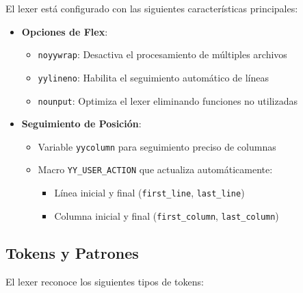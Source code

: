 \documentclass[11pt, a4paper, twoside]{article} %
\begin{document}
El lexer está configurado con las siguientes características principales:

\begin{itemize}
    \item \textbf{Opciones de Flex}:
    \begin{itemize}
        \item \texttt{noyywrap}: Desactiva el procesamiento de múltiples archivos
        \item \texttt{yylineno}: Habilita el seguimiento automático de líneas
        \item \texttt{nounput}: Optimiza el lexer eliminando funciones no utilizadas
    \end{itemize}
    
    \item \textbf{Seguimiento de Posición}:
    \begin{itemize}
        \item Variable \texttt{yycolumn} para seguimiento preciso de columnas
        \item Macro \texttt{YY\_USER\_ACTION} que actualiza automáticamente:
        \begin{itemize}
            \item Línea inicial y final (\texttt{first\_line}, \texttt{last\_line})
            \item Columna inicial y final (\texttt{first\_column}, \texttt{last\_column})
        \end{itemize}
    \end{itemize}
\end{itemize}

\subsection{Tokens y Patrones}

El lexer reconoce los siguientes tipos de tokens:
\end{document}
